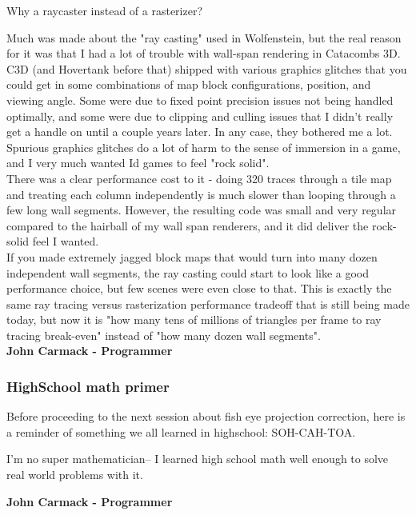 \begin{fancyquotes}
Why a raycaster instead of a rasterizer?\\
\par
Much was made about the "ray casting" used in Wolfenstein, but the real reason for it was that I had a lot of trouble with wall-span rendering in Catacombs 3D.  C3D (and Hovertank before that) shipped with various graphics glitches that you could get in some combinations of map block configurations, position, and viewing angle.  Some were due to fixed point precision issues not being handled optimally, and some were due to clipping and culling issues that I didn't really get a handle on until a couple years later.  In any case, they bothered me a lot.  Spurious graphics glitches do a lot of harm to the sense of immersion in a game, and I very much wanted Id games to feel "rock solid".
 \bigskip \\
There was a clear performance cost to it - doing 320 traces through a tile map and treating each column independently is much slower than looping through a few long wall segments.  However, the resulting code was small and very regular compared to the hairball of my wall span renderers, and it did deliver the rock-solid feel I wanted.
 \bigskip \\
If you made extremely jagged block maps that would turn into many dozen independent wall segments, the ray casting could start to look like a good performance choice, but few scenes were even close to that.  This is exactly the same ray tracing versus rasterization performance tradeoff that is still being made today, but now it is "how many tens of millions of triangles per frame to ray tracing break-even" instead of "how many dozen wall segments".
 \bigskip \\
\textbf{John Carmack - Programmer}
 \end{fancyquotes}







\subsubsection{HighSchool math primer}
Before proceeding to the next session about fish eye projection correction, here is a reminder of something we all learned in highschool: SOH-CAH-TOA.

 \begin{fancyquotes}
  I'm no super mathematician-- I learned high school math well enough to solve real world problems with it.\\
 \par
\textbf{John Carmack - Programmer}
 \end{fancyquotes}


